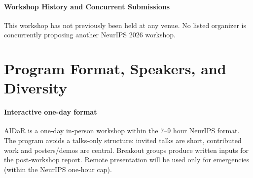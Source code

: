 \documentclass[10pt]{article}
\begin{document}
\paragraph{Workshop History and Concurrent Submissions}
\label{sec:history}
This workshop has not previously been held at any venue. No listed organizer is concurrently proposing another NeurIPS 2026 workshop.

\section{Program Format, Speakers, and Diversity}
\label{sec:program}

\paragraph{Interactive one-day format}
\label{sec:format}
AIDaR is a one-day in-person workshop within the 7--9 hour NeurIPS format. The program avoids a talks-only structure: invited talks are short, contributed work and posters/demos are central.  Breakout groups produce written inputs for the post-workshop report. Remote presentation will be used only for emergencies (within the NeurIPS one-hour cap).
\end{document}
